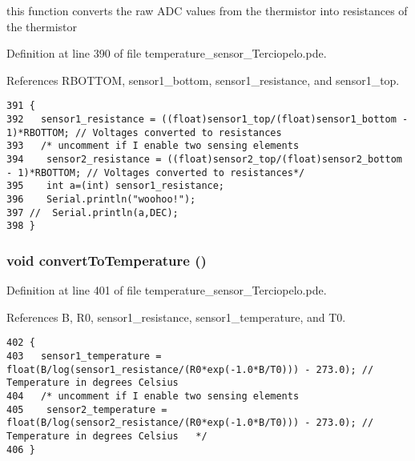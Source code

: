 this function converts the raw ADC values from the thermistor into resistances of the thermistor 



Definition at line 390 of file temperature\_\-sensor\_\-Terciopelo.pde.

References RBOTTOM, sensor1\_\-bottom, sensor1\_\-resistance, and sensor1\_\-top.

\begin{Code}\begin{verbatim}391 {
392   sensor1_resistance = ((float)sensor1_top/(float)sensor1_bottom - 1)*RBOTTOM; // Voltages converted to resistances
393   /* uncomment if I enable two sensing elements
394    sensor2_resistance = ((float)sensor2_top/(float)sensor2_bottom - 1)*RBOTTOM; // Voltages converted to resistances*/
395    int a=(int) sensor1_resistance;
396    Serial.println("woohoo!");
397 //  Serial.println(a,DEC);
398 }
\end{verbatim}
\end{Code}


\hypertarget{applet_2temperature__sensor___terciopelo_8pde_3aa4f99331713009a70ee34eba83754b}{
\subsubsection[{convertToTemperature}]{\setlength{\rightskip}{0pt plus 5cm}void convertToTemperature ()}}
\label{applet_2temperature__sensor___terciopelo_8pde_3aa4f99331713009a70ee34eba83754b}




Definition at line 401 of file temperature\_\-sensor\_\-Terciopelo.pde.

References B, R0, sensor1\_\-resistance, sensor1\_\-temperature, and T0.

\begin{Code}\begin{verbatim}402 {
403   sensor1_temperature = float(B/log(sensor1_resistance/(R0*exp(-1.0*B/T0))) - 273.0); // Temperature in degrees Celsius
404   /* uncomment if I enable two sensing elements
405    sensor2_temperature = float(B/log(sensor2_resistance/(R0*exp(-1.0*B/T0))) - 273.0); // Temperature in degrees Celsius   */
406 }
\end{verbatim}
\end{Code}


